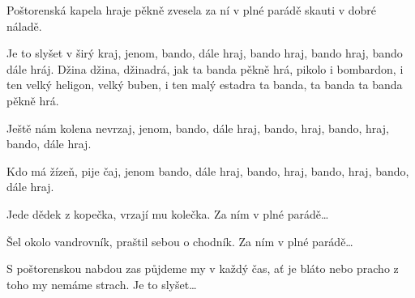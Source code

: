 
\beginverse{}
Poštorenská kapela hraje pěkně zvesela
za ní v plné parádě skauti v dobré náladě.
\endverse{}

\beginchorus{}
Je to slyšet v širý kraj, jenom, bando, dále hraj,
bando hraj, bando hraj, bando dále hráj.
Džina džina, džinadrá, jak ta banda pěkně hrá,
pikolo i bombardon, i ten velký heligon,
velký buben, i ten malý estadra
ta banda, ta banda ta banda pěkně hrá.
\endchorus{}

\beginverse{}
Ještě nám kolena nevrzaj, jenom, bando, dále hraj, bando, hraj, bando, hraj, bando, dále hraj.
\endverse{}

\beginverse{}
Kdo má žízeň, pije čaj, jenom bando, dále hraj, bando, hraj, bando, hraj, bando, dále hraj.
\endverse{}

\beginverse{}
Jede dědek z kopečka, vrzají mu kolečka. Za ním v plné parádě\ldots{}
\endverse{}

\beginverse{}
Šel okolo vandrovník, praštil sebou o chodník. Za ním v plné parádě\ldots{}
\endverse{}

\beginverse{}
S poštorenskou nabdou zas půjdeme my v každý čas, ať je bláto nebo pracho z toho my nemáme strach. Je to slyšet\ldots{}
\endverse{}

\endsong{}
